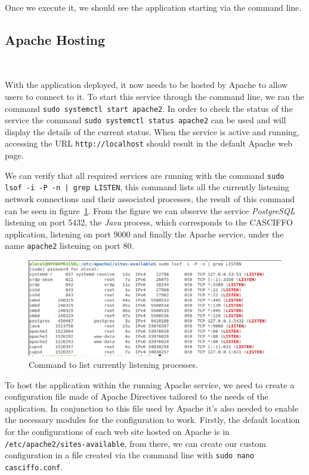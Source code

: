 Once we execute it, we should see the application starting via the command line.

\subsection{Apache Hosting}~\label{ch:impl:sec:install-deploy:ss:on-premises:ss:apache}

With the application deployed, it now needs to be hosted by Apache to allow users to connect to it.
To start this service through the command line, we ran the command \lstinline{sudo systemctl start apache2}.
In order to check the status of the service the command \lstinline{sudo systemctl status apache2} can be used and will display the details of the current status.
When the service is active and running, accessing the URL \lstinline[keywordstyle=\color{black},commentstyle=\color{black},stringstyle=\color{black}]{http://localhost} should result in the default Apache web page.

We can verify that all required services are running with the command \lstinline{sudo lsof -i -P -n | grep LISTEN}, this command lists all the currently listening network connections and their associated processes, the result of this command can be seen in figure~\ref{fig:list-programs}. From the figure we can observe the service \textit{PostgreSQL} listening on port 5432, the \textit{Java} process, which corresponds to the CASCIFFO application, listening on port 9000 and finally the Apache service, under the name \lstinline{apache2} listening on port 80.

\begin{figure}[H]
    \centering
    \includegraphics[scale=0.5]{Chapters/img/misc/ubuntu-services.png}
    \caption{Command to list currently listening processes.}
    \label{fig:list-programs}
\end{figure}



To host the application within the running Apache service, we need to create a configuration file made of Apache Directives tailored to the needs of the application. In conjunction to this file used by Apache it's also needed to enable the necessary modules for the configuration to work.
Firstly, the default location for the configurations of each web site hosted on Apache is in \lstinline[keywordstyle=\color{black},commentstyle=\color{black},stringstyle=\color{black}]{/etc/apache2/sites-available}, from there, we can create our custom configuration in a file created via the command line with \lstinline{sudo nano casciffo.conf}. 


